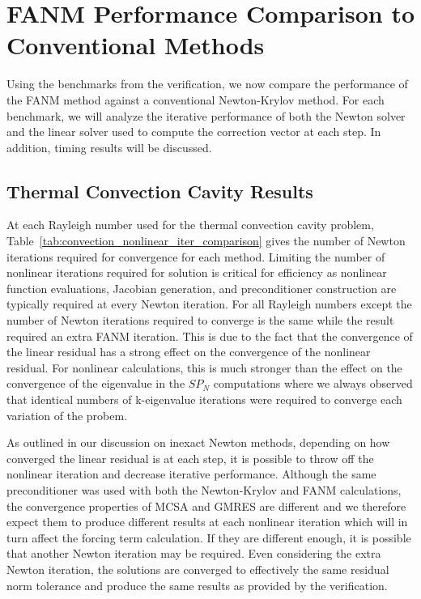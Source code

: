 \clearpage 

\section{FANM Performance Comparison to Conventional Methods\ }
\label{sec:fanm_comparison}

Using the benchmarks from the verification, we now compare the
performance of the FANM method against a conventional Newton-Krylov
method. For each benchmark, we will analyze the iterative performance
of both the Newton solver and the linear solver used to compute the
correction vector at each step. In addition, timing results will be
discussed.

\subsection{Thermal Convection Cavity Results}
\label{subsec:thermal_convection_comparison}

At each Rayleigh number used for the thermal convection cavity
problem, Table~\ref{tab:convection_nonlinear_iter_comparison} gives
the number of Newton iterations required for convergence for each
method. Limiting the number of nonlinear iterations required for
solution is critical for efficiency as nonlinear function evaluations,
Jacobian generation, and preconditioner construction are typically
required at every Newton iteration. For all Rayleigh numbers except
 the number of Newton iterations required to converge is the
same while the  result required an extra FANM iteration. This
is due to the fact that the convergence of the linear residual has a
strong effect on the convergence of the nonlinear residual. For
nonlinear calculations, this is much stronger than the effect on the
convergence of the eigenvalue in the $SP_N$ computations where we
always observed that identical numbers of k-eigenvalue iterations were
required to converge each variation of the probem.

As outlined in our discussion on inexact Newton methods, depending on
how converged the linear residual is at each step, it is possible to
throw off the nonlinear iteration and decrease iterative
performance. Although the same preconditioner was used with both the
Newton-Krylov and FANM calculations, the convergence properties of
MCSA and GMRES are different and we therefore expect them to produce
different results at each nonlinear iteration which will in turn
affect the forcing term calculation. If they are different enough, it
is possible that another Newton iteration may be required. Even
considering the extra Newton iteration, the solutions are converged to
effectively the same residual norm tolerance and produce the same
results as provided by the verification.

